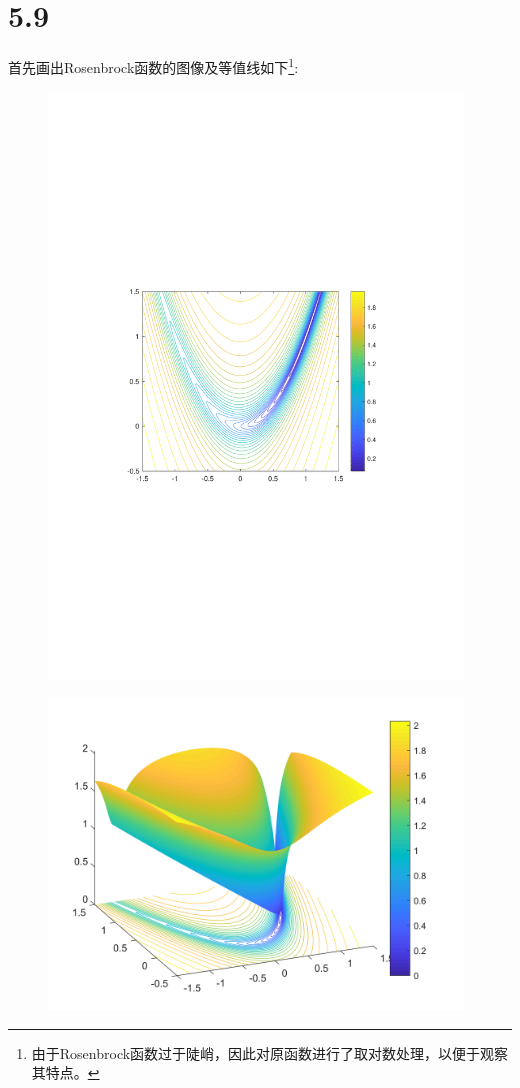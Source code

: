 \section{5.9}
首先画出Rosenbrock函数的图像及等值线如下\footnote{由于Rosenbrock函数过于陡峭，因此对原函数进行了取对数处理，以便于观察其特点。}:


\begin{figure}[H]
\centering
\includegraphics[width=11cm]{fig/4_01.pdf}
\end{figure}


\begin{figure}[H]
\centering
\includegraphics[width=11cm]{fig/4_02.png}
\end{figure}

